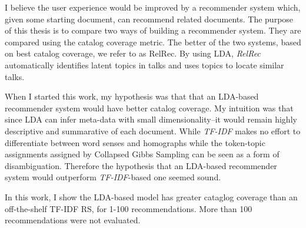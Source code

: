 I believe the user experience would be improved by a recommender system which, given some starting document, can recommend related documents. The purpose of this thesis is to compare two ways of building a recommender system. They are compared using the catalog coverage metric. The better of the two systems, based on best catalog coverage, we refer to as RelRec. By using LDA, \textit{RelRec} automatically identifies latent topics in talks and uses topics to locate similar talks.

When I started this work, my hypothesis was that that an LDA-based recommender system would have better catalog coverage. My intuition was that since LDA can infer meta-data with small dimensionality--it would remain highly descriptive and summarative of each document. While \emph{TF-IDF} makes no effort to differentiate between word senses and homographs while the token-topic assignments assigned by Collapsed Gibbs Sampling can be seen as a form of disambiguation. Therefore the hypothesis that an LDA-based recommender system would outperform \emph{TF-IDF}-based one seemed sound.

In this work, I show the LDA-based model has greater cataglog coverage than an off-the-shelf TF-IDF RS, for 1-100 recommendations. More than 100 recommendations were not evaluated.
